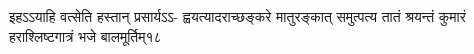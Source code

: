\fourlineindentedshlokanum
{इहऽऽयाहि वत्सेति हस्तान् प्रसार्यऽऽ-}
{ह्वयत्यादराच्छङ्करे मातुरङ्कात्}
{समुत्पत्य तातं श्रयन्तं कुमारं}
{हराश्लिष्टगात्रं भजे बालमूर्तिम्}{१८}

%
%
%
%
%
%
%
%
%
%
%
%
%
%
